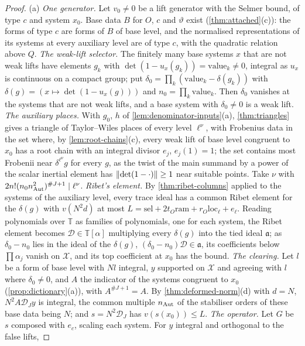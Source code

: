 \begin{proof}
(a) \emph{One generator.} Let $v_0\ne0$ be a lift generator with the Selmer bound, of type $c$ and system $x_0$. Base data $B$ for $O$, $c$ and $\vartheta$ exist (\cref{thm:attached}(c)): the forms of type $c$ are forms of $B$ of base level, and the
normalised representations of its systems at every auxiliary level are of type $c$, with the quadratic relation above $Q$. \emph{The weak-lift selector.} The finitely many base systems $x$ that are not weak lifts have elements $g_k$ with
$\det(1-u_x(g_k))=\mathrm{value}_k\ne0$, integral as $u_x$ is continuous on a compact group; put $\delta_0=\prod_k(\mathrm{value}_k-\delta(g_k))$ with $\delta(g)=(x\mapsto\det(1-u_x(g)))$ and $n_0=\prod_k\mathrm{value}_k$. Then $\delta_0$ vanishes at the systems that are not weak lifts,
and a base system with $\delta_0\ne0$ is a weak lift. \emph{The auxiliary places.} With $g_0$, $h$ of \cref{lem:denominator-inputs}(a), \cref{thm:triangles} gives a triangle of Taylor--Wiles places of every level $\ell^{\nu}$, with Frobenius data in the
set where, by \cref{lem:root-chains}(c), every weak lift of base level congruent to $x_0$ has a root chain with an integral divisor $e_j$, $e_j(1)=1$; the set contains most Frobenii near $\delta^{\ell^\nu}g$ for every $g$, as the twist of the main
summand by a power of the scalar inertial element has $\lVert \det(1-\cdot)\rVert\ge1$ near suitable points. Take $\nu$ with $2n!(n_0n_{\rm Aut}^2)^{\#J+1}\mid\ell^\nu$. \emph{Ribet's element.} By \cref{thm:ribet-columns} applied to the systems of the auxiliary level,
every trace ideal has a common Ribet element for the $\delta(g)$ with $v(N^2d)$ at most $L=\mathrm{sel}+2t_O\mathrm{ram}+r_O\mathrm{loc}_\ell+e_\ell$. Reading polynomials over $\mathbb T$ as families of polynomials, one for each system, the Ribet element becomes $\mathcal D\in\mathbb T[\alpha]$
multiplying every $\delta(g)$ into the tied ideal $\mathfrak a$; as $\delta_0-n_0$ lies in the ideal of the $\delta(g)$, $(\delta_0-n_0)\mathcal D\in\mathfrak a$, its coefficients below $\prod\alpha_j$ vanish on $\mathcal X$, and its top coefficient at $x_0$ has the bound. \emph{The
clearing.} Let $l$ be a form of base level with $N l$ integral, $y$ supported on $\mathcal X$ and agreeing with $l$ where $\delta_0\ne0$, and $A$ the indicator of the systems congruent to $x_0$ (\cref{prop:dictionary}(a)), with $A^{\#J+1}=A$. By
\cref{thm:deformed-norm}(d) with $d=N$, $N^2A\mathcal D_Jy$ is integral, the common multiple $n_{\rm Aut}$ of the stabiliser orders of these base data being $N$; and $s=N^2\mathcal D_J$ has $v(s(x_0))\le L$. \emph{The operator.} Let $G$ be $s$ composed with $e_c$, scaling each system. For $y$ integral and orthogonal to the false lifts,

\end{proof}
